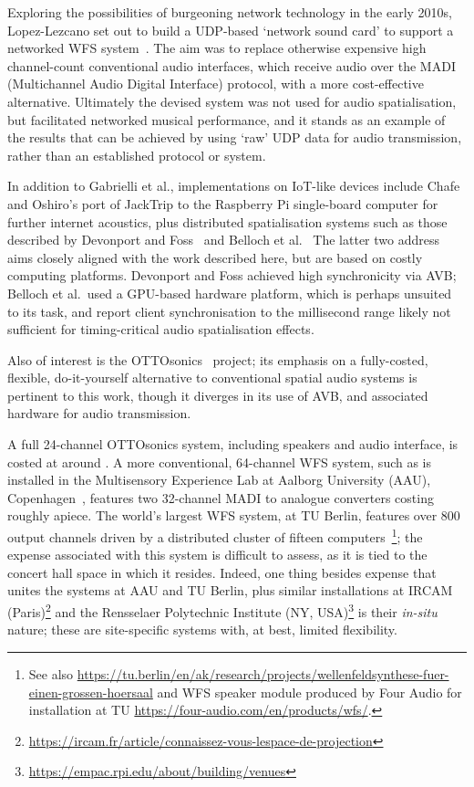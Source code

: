 Exploring the possibilities of burgeoning network technology in the early 2010s,
Lopez-Lezcano set out to build a UDP-based `network sound card' to support
a networked WFS system~\citep{lopez-lezcano_jack_2012}.
The aim was to replace otherwise expensive high channel-count conventional
audio interfaces, which receive audio over the MADI (Multichannel Audio Digital
Interface) protocol, with a more cost-effective alternative.
Ultimately the devised system was not used for audio spatialisation, but
facilitated networked musical performance, and it stands as an example of the
results that can be achieved by using `raw' UDP data for audio transmission,
rather than an established protocol or system.

In addition to Gabrielli et al., implementations on IoT-like devices include
Chafe and Oshiro's port of JackTrip to the Raspberry Pi single-board computer
for further internet acoustics, plus distributed spatialisation systems such as
those described by Devonport and Foss~\citep{devonport_distribution_2019} and
Belloch et al.~\citep{belloch_performance_2021}
The latter two address aims closely aligned with the work described here, but
are based on costly computing platforms.
Devonport and Foss achieved high synchronicity via AVB; Belloch et al.\ used a
GPU-based hardware platform, which is perhaps unsuited to its task, and report
client synchronisation to the millisecond range \textemdash{} likely not
sufficient for timing-critical audio spatialisation effects.

Also of interest is the OTTOsonics~\citep{mitterhuber_ottosonics_2022}
project;
its emphasis on a fully-costed, flexible, do-it-yourself alternative to
conventional spatial audio systems is pertinent to this work, though it diverges
in its use of AVB, and associated hardware for audio transmission.

A full 24-channel OTTOsonics system, including speakers and audio interface, is
costed at around .
A more conventional, 64-channel WFS system, such as is installed in the
Multisensory Experience Lab at Aalborg University (AAU),
Copenhagen~\citep{grani_gestural_2016}, features two 32-channel MADI to analogue
converters costing roughly  apiece.
The world's largest WFS system, at TU Berlin, features over 800 output channels
driven by a distributed cluster of fifteen
computers~\citep{baalman_renewed_2007}\footnote{
    See also
    \url{https://tu.berlin/en/ak/research/projects/wellenfeldsynthese-fuer-einen-grossen-hoersaal}
    and WFS speaker module produced by Four Audio for installation at TU
    \url{https://four-audio.com/en/products/wfs/}.
}; the expense associated with this system is difficult to assess, as it is tied
to the concert hall space in which it resides.
Indeed, one thing besides expense that unites the systems at AAU and TU Berlin,
plus similar installations at IRCAM (Paris)\footnote{
    \url{https://ircam.fr/article/connaissez-vous-lespace-de-projection}
} and the Rensselaer Polytechnic Institute (NY, USA)\footnote{
    \url{https://empac.rpi.edu/about/building/venues}
} is their \textit{in-situ} nature;
these are site-specific systems with, at best, limited flexibility.

